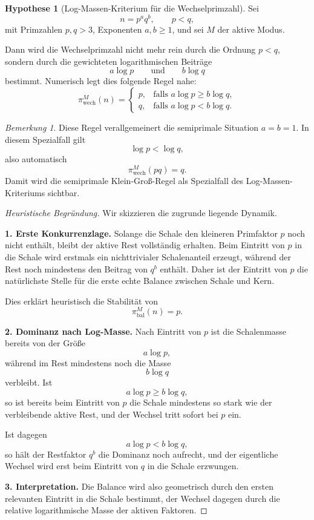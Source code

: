\documentclass[11pt,a4paper]{article}
\theoremstyle{definition}
\newtheorem{hypothese}[satz]{Hypothese}
\theoremstyle{remark}
\newtheorem{bemerkung}[satz]{Bemerkung}
\begin{document}
	\begin{hypothese}[Log-Massen-Kriterium für die Wechselprimzahl]
		\label{hyp:paqb_wechsel}
		Sei
		\[
		n=p^a q^b,\qquad p<q,
		\]
		mit Primzahlen \(p,q>3\), Exponenten \(a,b\ge 1\), und sei \(M\) der aktive Modus.
		
		Dann wird die Wechselprimzahl nicht mehr rein durch die Ordnung \(p<q\), sondern durch die
		gewichteten logarithmischen Beiträge
		\[
		a\log p
		\qquad\text{und}\qquad
		b\log q
		\]
		bestimmt. Numerisch legt dies folgende Regel nahe:
		\[
		\pi_{\mathrm{wech}}^{M}(n)=
		\begin{cases}
			p, & \text{falls } a\log p \ge b\log q,\\[1mm]
			q, & \text{falls } a\log p < b\log q.
		\end{cases}
		\]
	\end{hypothese}
	
	\begin{bemerkung}
		Diese Regel verallgemeinert die semiprimale Situation \(a=b=1\). In diesem Spezialfall gilt
		\[
		\log p<\log q,
		\]
		also automatisch
		\[
		\pi_{\mathrm{wech}}^{M}(pq)=q.
		\]
		Damit wird die semiprimale Klein-Groß-Regel als Spezialfall des Log-Massen-Kriteriums
		sichtbar.
	\end{bemerkung}
	
	\begin{proof}[Heuristische Begründung]
		Wir skizzieren die zugrunde liegende Dynamik.
		
		\medskip
		\noindent
		\textbf{1. Erste Konkurrenzlage.}
		Solange die Schale den kleineren Primfaktor \(p\) noch nicht enthält, bleibt der aktive
		Rest vollständig erhalten. Beim Eintritt von \(p\) in die Schale wird erstmals ein
		nichttrivialer Schalenanteil erzeugt, während der Rest noch mindestens den Beitrag von
		\(q^b\) enthält. Daher ist der Eintritt von \(p\) die natürlichste Stelle für die erste
		echte Balance zwischen Schale und Kern.
		
		Dies erklärt heuristisch die Stabilität von
		\[
		\pi_{\mathrm{bal}}^{M}(n)=p.
		\]
		
		\medskip
		\noindent
		\textbf{2. Dominanz nach Log-Masse.}
		Nach Eintritt von \(p\) ist die Schalenmasse bereits von der Größe
		\[
		a\log p,
		\]
		während im Rest mindestens noch die Masse
		\[
		b\log q
		\]
		verbleibt. Ist
		\[
		a\log p \ge b\log q,
		\]
		so ist bereits beim Eintritt von \(p\) die Schale mindestens so stark wie der verbleibende
		aktive Rest, und der Wechsel tritt sofort bei \(p\) ein.
		
		Ist dagegen
		\[
		a\log p < b\log q,
		\]
		so hält der Restfaktor \(q^b\) die Dominanz noch aufrecht, und der eigentliche Wechsel wird
		erst beim Eintritt von \(q\) in die Schale erzwungen.
		
		\medskip
		\noindent
		\textbf{3. Interpretation.}
		Die Balance wird also geometrisch durch den ersten relevanten Eintritt in die Schale
		bestimmt, der Wechsel dagegen durch die relative logarithmische Masse der aktiven Faktoren.
	\end{proof}
	
\end{document}
